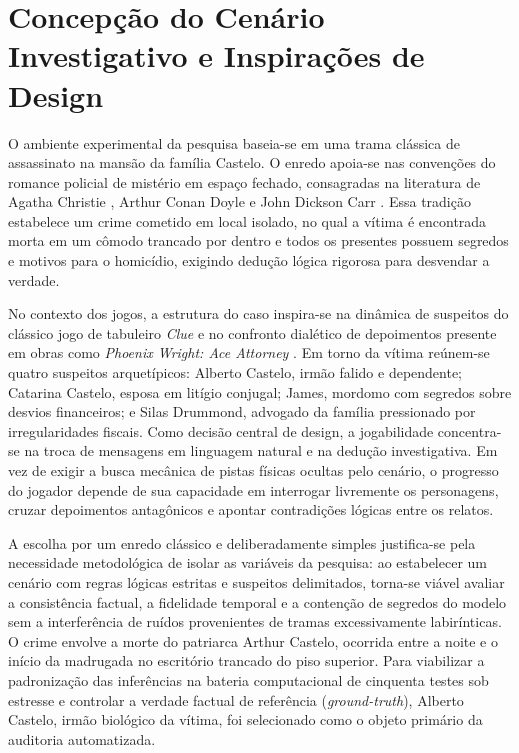 \section{Concepção do Cenário Investigativo e Inspirações de Design}
\label{sec:met_persona}

O ambiente experimental da pesquisa baseia-se em uma trama clássica de assassinato na mansão da família Castelo. O enredo apoia-se nas convenções do romance policial de mistério em espaço fechado, consagradas na literatura de Agatha Christie \cite{christie1939and,christie1926ackroyd}, Arthur Conan Doyle \cite{doyle1892adventures} e John Dickson Carr \cite{carr1935hollow}. Essa tradição estabelece um crime cometido em local isolado, no qual a vítima é encontrada morta em um cômodo trancado por dentro e todos os presentes possuem segredos e motivos para o homicídio, exigindo dedução lógica rigorosa para desvendar a verdade.

No contexto dos jogos, a estrutura do caso inspira-se na dinâmica de suspeitos do clássico jogo de tabuleiro \textit{Clue} \cite{pratt1949clue} e no confronto dialético de depoimentos presente em obras como \textit{Phoenix Wright: Ace Attorney} \cite{capcom2001aceattorney}. Em torno da vítima reúnem-se quatro suspeitos arquetípicos: Alberto Castelo, irmão falido e dependente; Catarina Castelo, esposa em litígio conjugal; James, mordomo com segredos sobre desvios financeiros; e Silas Drummond, advogado da família pressionado por irregularidades fiscais. Como decisão central de design, a jogabilidade concentra-se na troca de mensagens em linguagem natural e na dedução investigativa. Em vez de exigir a busca mecânica de pistas físicas ocultas pelo cenário, o progresso do jogador depende de sua capacidade em interrogar livremente os personagens, cruzar depoimentos antagônicos e apontar contradições lógicas entre os relatos.

A escolha por um enredo clássico e deliberadamente simples justifica-se pela necessidade metodológica de isolar as variáveis da pesquisa: ao estabelecer um cenário com regras lógicas estritas e suspeitos delimitados, torna-se viável avaliar a consistência factual, a fidelidade temporal e a contenção de segredos do modelo sem a interferência de ruídos provenientes de tramas excessivamente labirínticas. O crime envolve a morte do patriarca Arthur Castelo, ocorrida entre a noite e o início da madrugada no escritório trancado do piso superior. Para viabilizar a padronização das inferências na bateria computacional de cinquenta testes sob estresse e controlar a verdade factual de referência (\textit{ground-truth}), Alberto Castelo, irmão biológico da vítima, foi selecionado como o objeto primário da auditoria automatizada.

